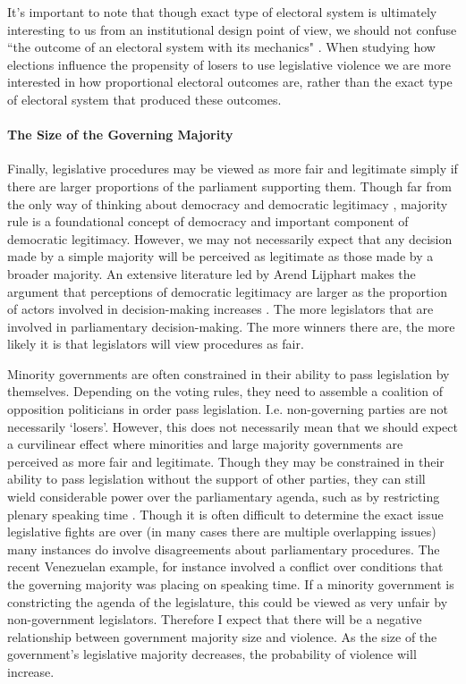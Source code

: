 \documentclass[a4paper]{article}\usepackage{graphicx, color}
\begin{document}
It's important to note that though exact type of electoral system is ultimately interesting to us from an institutional design point of view, we should not confuse ``the outcome of an electoral system with its mechanics" \citep[][109]{Golder2005}. When studying how elections influence the propensity of losers to use legislative violence we are more interested in how proportional electoral outcomes are, rather than the exact type of electoral system that produced these outcomes. 

\paragraph{The Size of the Governing Majority}

Finally, legislative procedures may be viewed as more fair and legitimate simply if there are larger proportions of the parliament supporting them. Though far from the only way of thinking about democracy and democratic legitimacy \cite[see][for a discussion]{Follesdal2006}, majority rule is a foundational concept of democracy \cite{Dahl1989} and important component of democratic legitimacy. However, we may not necessarily expect that any decision made by a simple majority will be perceived as legitimate as those made by a broader majority. An extensive literature led by Arend Lijphart makes the argument that perceptions of democratic legitimacy are larger as the proportion of actors involved in decision-making increases \citep{Lijphart2007}. The more legislators that are involved in parliamentary decision-making. The more winners there are, the more likely it is that legislators will view procedures as fair. 

Minority governments are often constrained in their ability to pass legislation by themselves. Depending on the voting rules, they need to assemble a coalition of opposition politicians in order pass legislation. I.e. non-governing parties are not necessarily `losers'. However, this does not necessarily mean that we should expect a curvilinear effect where minorities and large majority governments are perceived as more fair and legitimate. Though they may be constrained in their ability to pass legislation without the support of other parties, they can still wield considerable power over the parliamentary agenda, such as by restricting plenary speaking time \citep{Tsebelis2002}. Though it is often difficult to determine the exact issue legislative fights are over (in many cases there are multiple overlapping issues) many instances do involve disagreements about parliamentary procedures. The recent Venezuelan example, for instance involved a conflict over conditions that the governing majority was placing on speaking time. If a minority government is constricting the agenda of the legislature, this could be viewed as very unfair by non-government legislators. Therefore I expect that there will be a negative relationship between government majority size and violence. As the size of the government's legislative majority decreases, the probability of violence will increase.
\end{document}
